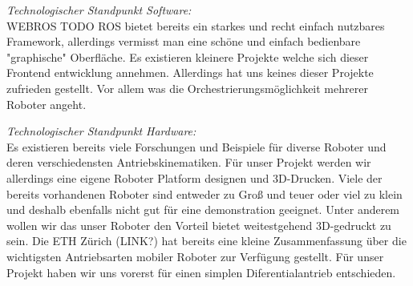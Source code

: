 \begin{flushleft}
    \textit{Technologischer Standpunkt Software:}\\
    WEBROS TODO
    ROS bietet bereits ein starkes und recht einfach nutzbares Framework, allerdings vermisst man eine 
    schöne und einfach bedienbare "graphische" Oberfläche.
    Es existieren kleinere Projekte welche sich dieser Frontend entwicklung annehmen. 
    Allerdings hat uns keines dieser Projekte zufrieden gestellt. 
    Vor allem was die Orchestrierungsmöglichkeit mehrerer Roboter angeht.
\end{flushleft}

\begin{flushleft}
    \textit{Technologischer Standpunkt Hardware:} \\
    Es existieren bereits viele Forschungen und Beispiele für diverse Roboter
    und deren verschiedensten Antriebskinematiken.
    Für unser Projekt werden wir allerdings eine eigene Roboter Platform designen und 3D-Drucken.
    Viele der bereits vorhandenen Roboter sind entweder zu Groß und teuer oder viel zu klein und deshalb ebenfalls nicht 
    gut für eine demonstration geeignet. Unter anderem wollen wir das unser Roboter den Vorteil bietet weitestgehend
    3D-gedruckt zu sein.
    Die ETH Zürich (LINK?) hat bereits eine kleine Zusammenfassung über die wichtigsten Antriebsarten mobiler Roboter zur Verfügung gestellt.
    Für unser Projekt haben wir uns vorerst für einen simplen Diferentialantrieb entschieden. 
\end{flushleft}